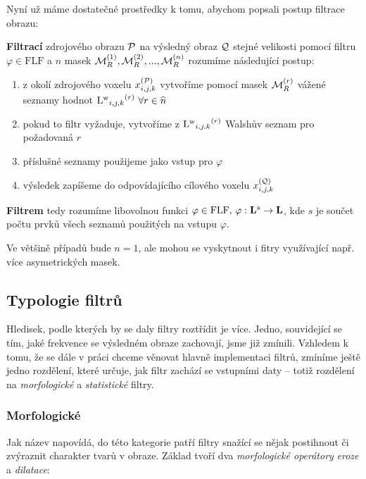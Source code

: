     Nyní už máme dostatečné prostředky k tomu, abychom popsali postup filtrace obrazu:
    \begin{define}\label{def filtr}
      \textbf{Filtrací} zdrojového obrazu $\mathcal{P}$ na výsledný obraz $\mathcal{Q}$ stejné velikosti pomocí filtru $\varphi \in \mathrm{FLF}$ a $n$ masek $\mathcal{M}_R^{(1)},\mathcal{M}_R^{(2)},...,\mathcal{M}_R^{(n)}$ rozumíme následující postup:
      \begin{enumerate}
      \item z okolí zdrojového voxelu $x_{i,j,k}^{(\mathcal{P})}$ vytvoříme pomocí masek $\mathcal{M}_R^{(r)}$ vážené seznamy hodnot ${\mathrm{L^w}_{i,j,k}}^{(r)} \,\, \forall r \in \widehat n$
      \item pokud to filtr vyžaduje, vytvoříme z ${\mathrm{L^w}_{i,j,k}}^{(r)}$ Walshův seznam pro požadovaná $r$
      \item příslušné seznamy použijeme jako vstup pro $\varphi$
      \item výsledek zapíšeme do odpovídajícího cílového voxelu $x_{i,j,k}^{(\mathcal{Q})}$
      \end{enumerate}
      \textbf{Filtrem} tedy rozumíme libovolnou funkci $\varphi \in \mathrm{FLF}, \,\varphi : \mathbf{L}^s \rightarrow \mathbf{L}$, kde $s$ je součet počtu prvků všech seznamů použitých na vstupu $\varphi$.
    \end{define}
    
    Ve většině případů bude $n = 1$, ale mohou se vyskytnout i fitry využívající např. více asymetrických masek.
    
    \subsection{Typologie filtrů}\label{Typologie}       %
    
    Hledisek, podle kterých by se daly filtry roztřídit je více. Jedno, souvidející se tím, jaké frekvence se výsledném obraze zachovají, jsme již zmínili. Vzhledem k tomu, že se dále v práci chceme věnovat hlavně implementaci filtrů, zmíníme ještě jedno rozdělení, které určuje, jak filtr zachází se vstupními daty -- totiž rozdělení na \emph{morfologické} a \emph{statistické} filtry.
    
        \subsubsection{Morfologické}
        Jak název napovídá, do této kategorie patří filtry snažící se nějak postihnout či zvýraznit charakter tvarů v obraze. Základ tvoří dva \emph{morfologické operátory} \emph{eroze} a \emph{dilatace}:
        
